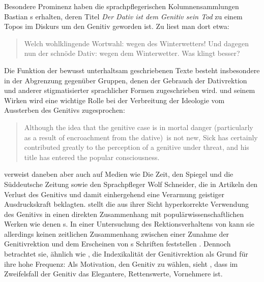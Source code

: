 Besondere Prominenz haben die sprachpflegerischen Kolumnensammlungen Bastian \citeauthor{Sick2006}s erhalten, deren Titel \textit{Der Dativ ist dem Genitiv sein Tod} zu einem Topos im Diskurs um den Genitiv geworden ist. 
Zu \wegen{} liest man dort etwa: 
\begin{quote} Welch wohlklingende Wortwahl: wegen des Winterwetters! Und dagegen nun der schnöde Dativ: wegen dem Winterwetter. Was klingt besser? \citep[101]{Sick2006} \end{quote}
Die Funktion der bewusst unterhaltsam geschriebenen Texte besteht insbesondere in der Abgrenzung gegenüber Gruppen, denen der Gebrauch der Dativrektion und anderer stigmatisierter sprachlicher Formen zugeschrieben wird.  
\citeauthor{Sick2006} und seinem Wirken wird eine wichtige Rolle bei der Verbreitung der Ideologie vom Aussterben des Genitivs zugesprochen: 
\begin{quote}Although the idea that the genitive case is in mortal danger (particularly as a result of encroachment from the dative)~is not new, Sick has certainly contributed greatly to the perception of a genitive under threat, and his title has entered the popular consciousness.~\citep[24]{Scott.2014}\end{quote}
\citet[323]{Langer.} verweist daneben aber auch auf Medien wie Die Zeit, den Spiegel und die S{\"u}ddeutsche Zeitung sowie den Sprachpfleger Wolf Schneider, die in Artikeln den Verlust des Genitivs und damit einhergehend eine {\glqq}Verarmung geistiger Ausdruckskraft{\grqq} beklagten. 
\citet[9]{Krause2012b} stellt die aus ihrer Sicht hyperkorrekte Verwendung des Genitivs in einen direkten Zusammenhang mit popul{\"a}rwissenschaftlichen Werken wie denen \citeauthor{Sick2006}s. 
In einer Untersuchung des Rektionsverhaltens von  kann sie allerdings keinen zeitlichen Zusammenhang zwischen einer Zunahme der Genitivrektion und dem Erscheinen von \citeauthor{Sick2006}s Schriften feststellen \citep[s.][347]{Krause2012a}. 
Dennoch betrachtet sie, ähnlich wie \citet[211]{Becker2011}, die Indexikalität der Genitivrektion als Grund für ihre hohe Frequenz: 
Als Motivation, den Genitiv zu w{\"a}hlen, sieht \citet[19]{Krause2012b}, {\glqq}dass im Zweifelsfall der Genitiv das Elegantere, Rettenswerte, Vornehmere ist{\grqq}. 

